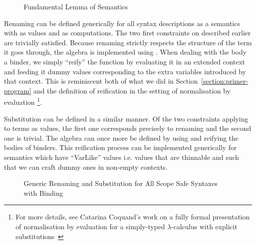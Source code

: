 \begin{figure}[h]
{\center {}}
\hspace{-1em}\begin{minipage}{0.40\textwidth}
\end{minipage}\hspace{2em}
\hspace{-1em}\begin{minipage}{0.50\textwidth}
\end{minipage}
\caption{Fundamental Lemma of Semantics}
\end{figure}

Renaming can be defined generically for all syntax descriptions as a
semantics with  as values and  as computations. The
two first constraints on  described earlier are trivially
satisfied. Because renaming strictly respects the structure of the
term it goes through, the algebra is implemented using .
When dealing with the body a binder, we simply ``reify'' the
 function by evaluating it in an extended context and
feeding it dummy values corresponding to the extra variables
introduced by that context. This is reminiscent both of what we
did in Section~\ref{section:primer-program} and the definition
of reification in the setting of normalisation by evaluation
\footnote{For more details, see Catarina Coquand's work on a
fully formal presentation of normalisation by evaluation for a
simply-typed $\lambda$-calculus with explicit substitutions~\cite{coquand2002formalised}}.

Substitution can be defined in a similar manner. Of the two
constraints applying to terms as values, the first one corresponds
precisely to renaming and the second one is trivial. The algebra
can once more be defined by using  and reifying the bodies
of binders. This reification process can be implemented generically
for semantics which have ``VarLike'' values i.e. values that are
thinnable and such that we can craft dummy ones in non-empty contexts.

\begin{figure}[h]
\begin{minipage}{0.40\textwidth}
\end{minipage}\hspace{2em}
\begin{minipage}{0.50\textwidth}
\end{minipage}

\begin{minipage}{0.45\textwidth}
\end{minipage}\hspace{2em}
\begin{minipage}{0.45\textwidth}
\end{minipage}
\caption{Generic Renaming and Substitution for All Scope Safe Syntaxes with Binding}
\end{figure}



